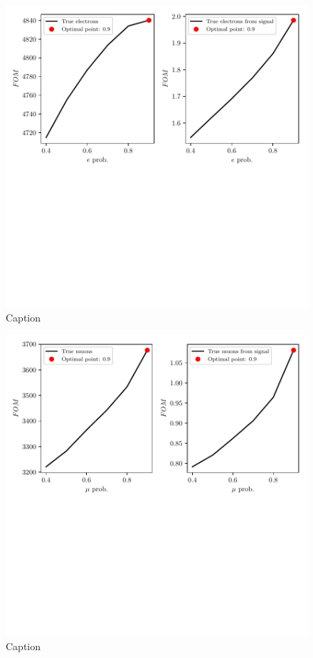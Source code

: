 \documentclass[oneside,a4paper,openany,12pt]{scrbook}
\begin{document}
\begin{figure}[!h]
\centering
\includegraphics[scale=1]{fig/FSP_e_fom}
\caption{Caption}
\end{figure}

\begin{figure}[!h]
\centering
\includegraphics[scale=1]{fig/FSP_mu_fom}
\caption{Caption}
\end{figure}
\end{document}
